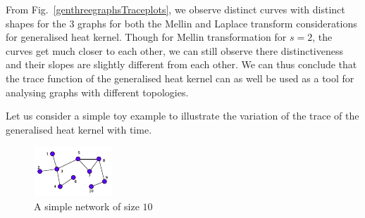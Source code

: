 \documentclass[10pt,a4paper]{article}
\begin{document}
        From Fig.~\ref{genthreegraphsTraceplots}, we observe distinct curves with distinct shapes for the $3$ graphs for both the Mellin and Laplace transform considerations for generalised heat kernel. Though for Mellin transformation for $s=2$, the curves get much closer to each other, we can still observe there distinctiveness and their slopes are slightly different from each other. We can thus conclude that the trace function of the generalised heat kernel can as well be used as a tool for analysing graphs with different topologies.
        
        
        Let us consider a simple toy example to illustrate the variation of the trace of the generalised heat kernel with time.
        \begin{figure}[H]
        	\centering
        	\includegraphics[width= 0.35 \textwidth]{images/diffusion-graph.pdf}
        	\caption{}
        	\label{keneltoymodel2}
        	\caption{A simple network of size $10$}
        	\label{}
        \end{figure}
        
\end{document}
